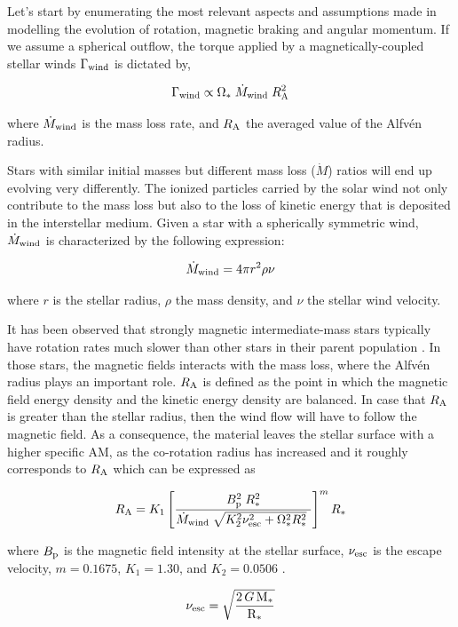 \documentclass[fleqn,usenatbib]{mnras}
\begin{document}
\begin{ceqn}
Let's start by enumerating the most relevant aspects and assumptions made in modelling the evolution of rotation, magnetic braking and angular momentum. If we assume a spherical outflow, the torque applied by a magnetically-coupled stellar winds $\Gamma_{\mathrm{wind}}$ is dictated by,
\begin{ceqn}
\begin{equation}
    \Gamma_{\mathrm{wind}} \propto \Omega_* \; \Dot{M}_{\mathrm{wind}} \; R_{\mathrm{A}}^{2} \label{eq:mb_torque}
\end{equation}
\end{ceqn}
where $\Dot{M}_{\mathrm{wind}}$ is the mass loss rate, and $R_{\mathrm{A}}$ the averaged value of the Alfvén radius.\par
Stars with similar initial masses but different mass loss ($\Dot{M}$) ratios will end up evolving very differently. The ionized particles carried by the solar wind not only contribute to the mass loss but also to the loss of kinetic energy that is deposited in the interstellar medium. Given a star with a spherically symmetric wind, $\Dot{M}_{\mathrm{wind}}$ is characterized by the following expression:

\begin{ceqn}
\begin{equation}
    \Dot{M}_{\mathrm{wind}} = 4\pi r^2\rho\nu \label{eq:mass_loss}
\end{equation}
\end{ceqn}
where $r$ is the stellar radius, $\rho$ the mass density, and $\nu$ the stellar wind velocity.

It has been observed that strongly magnetic intermediate-mass stars typically have rotation rates much slower than other stars in their parent population \citep{Mathys2006}. In those stars, the magnetic fields interacts with the mass loss, where the Alfv\'{e}n radius plays an important role. $R_{\mathrm{A}}$ is defined as the point in which the magnetic field energy density and the kinetic energy density are balanced. In case that $R_{\mathrm{A}}$ is greater than the stellar radius, then the wind flow will have to follow the magnetic field. As a consequence, the material leaves the stellar surface with a higher specific AM, as the co-rotation radius has increased and it roughly corresponds to $R_{\mathrm{A}}$ which can be expressed as \citep{Matt2012}
\begin{ceqn}
\begin{equation}
    R_{\mathrm{A}} = K_1\left[\frac{B_{\mathrm{p}}^{2}\;R_*^{2}}{\Dot{M}_{\mathrm{wind}}\;\sqrt{K_2^2\nu_{\mathrm{esc}}^2 + \Omega_*^2R_*^{2}}\ }\right]^{m}R_*  \label{eq:mb_ralfven}
\end{equation}
\end{ceqn}
where $B_{\mathrm{p}}$ is the magnetic field intensity at the stellar surface, $\nu_{\mathrm{esc}}$ is the escape velocity, $m = 0.1675$, $K_1 = 1.30$, and $K_2 = 0.0506$ \citep{Gallet2013}.
\begin{ceqn}
\begin{equation}
\nu_{\mathrm{esc}} = \sqrt{\frac{2\,G\,\mathrm{M}_*}{\mathrm{R}_*}} \label{eq:vesc}
\end{equation}
\end{ceqn}


\end{ceqn}
\end{document}
